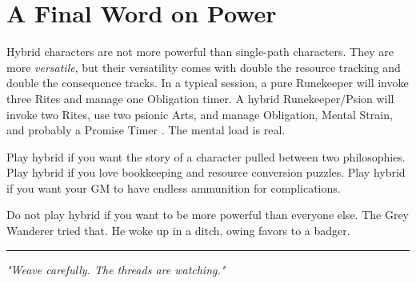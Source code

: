 \documentclass[10pt,a5paper]{book}
\begin{document}
\section*{A Final Word on Power}

Hybrid characters are not more powerful than single-path characters. They are more \textit{versatile}, but their versatility comes with double the resource tracking and double the consequence tracks. In a typical session, a pure Runekeeper will invoke three Rites and manage one Obligation timer. A hybrid Runekeeper/Psion will invoke two Rites, use two psionic Arts, and manage Obligation, Mental Strain, and probably a Promise Timer . The mental load is real.

Play hybrid if you want the story of a character pulled between two philosophies. Play hybrid if you love bookkeeping and resource conversion puzzles. Play hybrid if you want your GM to have endless ammunition for complications.

Do not play hybrid if you want to be more powerful than everyone else. The Grey Wanderer tried that. He woke up in a ditch, owing favors to a badger.

\vspace{0.5cm}
\hrule
\vspace{0.2cm}
\begin{center}
\small \textit{"Weave carefully. The threads are watching."}
\end{center}
\end{document}
